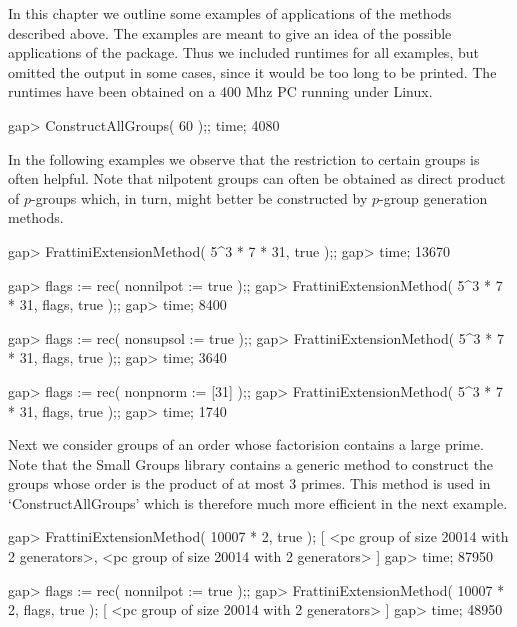 


In this chapter we outline some examples of applications of
the methods described above. The examples are meant to give
an idea of the possible applications of the package. Thus we
included runtimes for all examples, but omitted the output
in some cases, since it would be too long to be printed.
The runtimes have been obtained on a 400 Mhz PC running under
Linux.

\beginexample
gap> ConstructAllGroups( 60 );; time;
4080
\endexample

In the following examples we observe that the restriction to
certain groups is often helpful. Note that nilpotent groups
can often be obtained as direct product of $p$-groups which,
in turn, might better be constructed by $p$-group generation
methods.

\beginexample
gap> FrattiniExtensionMethod( 5^3 * 7 * 31, true );;
gap> time;
13670

gap> flags := rec( nonnilpot := true );;
gap> FrattiniExtensionMethod( 5^3 * 7 * 31, flags, true );;
gap> time;
8400

gap> flags := rec( nonsupsol := true );;
gap> FrattiniExtensionMethod( 5^3 * 7 * 31, flags, true );;
gap> time;
3640

gap> flags := rec( nonpnorm := [31] );;
gap> FrattiniExtensionMethod( 5^3 * 7 * 31, flags, true );;
gap> time;
1740
\endexample

Next we consider groups of an order whose factorision contains
a large prime. Note that the Small Groups library contains a
generic method to construct the groups whose order is the product
of at most 3 primes. This method is used in `ConstructAllGroups'
which is therefore much more efficient in the next example.

\beginexample
gap> FrattiniExtensionMethod( 10007 * 2, true );
[ <pc group of size 20014 with 2 generators>, 
  <pc group of size 20014 with 2 generators> ]
gap> time;
87950

gap> flags := rec( nonnilpot := true );;
gap> FrattiniExtensionMethod( 10007 * 2, flags, true  );
[ <pc group of size 20014 with 2 generators> ]
gap> time;
48950

